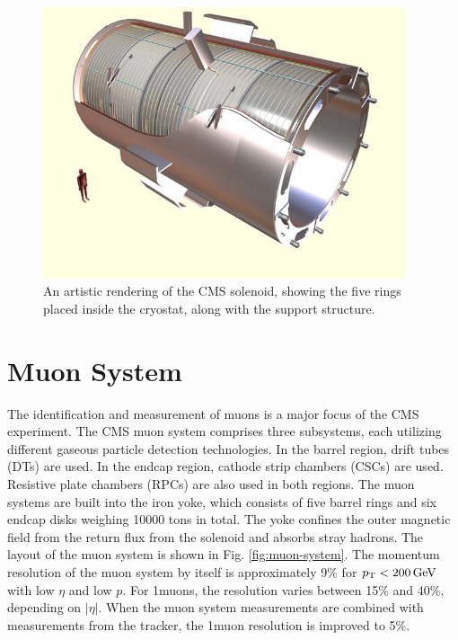 \begin{figure}[hbt]
\begin{center}
\includegraphics[width=0.95\textwidth]{figures/CMS_solenoid.jpg}
\caption{An artistic rendering of the CMS solenoid, showing the five rings placed inside the cryostat, along with the support structure.}
\label{fig:solenoid}
\end{center}
\end{figure}

\section{Muon System}
\label{sec:muon-system}

The identification and measurement of muons is a major focus of the CMS experiment. The CMS muon system comprises three subsystems, each utilizing different gaseous particle detection technologies. In the barrel region, drift tubes (DTs) are used. In the endcap region, cathode strip chambers (CSCs) are used. Resistive plate chambers (RPCs) are also used in both regions. The muon systems are built into the iron yoke, which consists of five barrel rings and six endcap disks weighing 10000 tons in total. The yoke confines the outer magnetic field from the return flux from the solenoid and absorbs stray hadrons. The layout of the muon system is shown in Fig. \ref{fig:muon-system}. The momentum resolution of the muon system by itself is approximately 9\% for $p_{\mathrm{T}}<200\,\text{Ge\hspace{-.08em}V}$ with low $\eta$ and low $p$. For 1\TeV muons, the resolution varies between 15\% and 40\%, depending on $|\eta|$. When the muon system measurements are combined with measurements from the tracker, the 1\TeV muon resolution is improved to 5\%.

